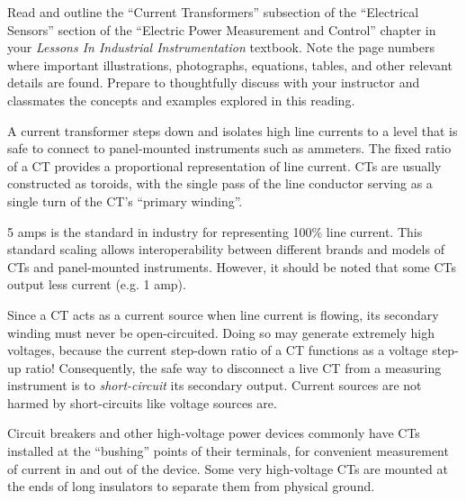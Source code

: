 

Read and outline the ``Current Transformers'' subsection of the ``Electrical Sensors'' section of the ``Electric Power Measurement and Control'' chapter in your {\it Lessons In Industrial Instrumentation} textbook.  Note the page numbers where important illustrations, photographs, equations, tables, and other relevant details are found.  Prepare to thoughtfully discuss with your instructor and classmates the concepts and examples explored in this reading.













A current transformer steps down and isolates high line currents to a level that is safe to connect to panel-mounted instruments such as ammeters.  The fixed ratio of a CT provides a proportional representation of line current.  CTs are usually constructed as toroids, with the single pass of the line conductor serving as a single turn of the CT's ``primary winding''.

5 amps is the standard in industry for representing 100\% line current.  This standard scaling allows interoperability between different brands and models of CTs and panel-mounted instruments.  However, it should be noted that some CTs output less current (e.g. 1 amp).

\vskip 10pt

Since a CT acts as a current source when line current is flowing, its secondary winding must never be open-circuited.  Doing so may generate extremely high voltages, because the current step-down ratio of a CT functions as a voltage step-up ratio!  Consequently, the safe way to disconnect a live CT from a measuring instrument is to {\it short-circuit} its secondary output.  Current sources are not harmed by short-circuits like voltage sources are.

\vskip 10pt

Circuit breakers and other high-voltage power devices commonly have CTs installed at the ``bushing'' points of their terminals, for convenient measurement of current in and out of the device.  Some very high-voltage CTs are mounted at the ends of long insulators to separate them from physical ground.







